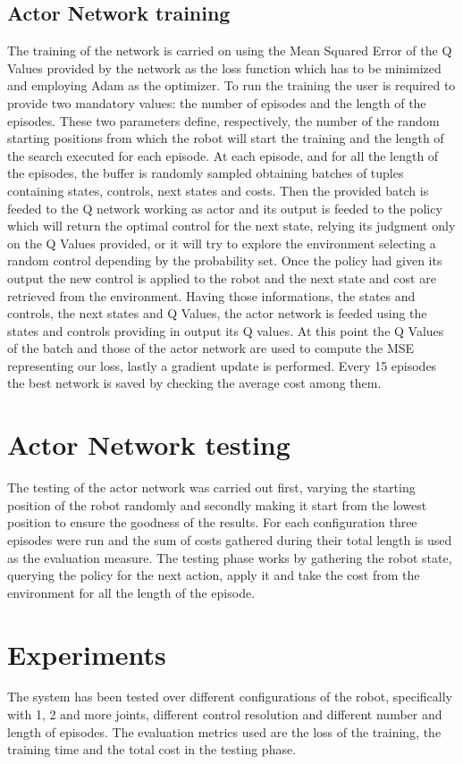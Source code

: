 \documentclass[twocolumn, a4paper]{article}
\begin{document}
\subsection{Actor Network training}
The training of the network is carried on using the Mean Squared Error of the
Q Values provided by the network as the loss function which has to be
minimized and employing Adam as the optimizer.
To run the training the user is required to provide two mandatory values: the
number of episodes and the length of the episodes. These two parameters define,
respectively, the number of the random starting positions from which the 
robot will start the training and the length of the search executed for each
episode.
At each episode, and for all the length of the episodes, the buffer is randomly
sampled obtaining batches of tuples containing states, controls, next states
and costs. Then the provided batch is feeded to the Q network working as actor
and its output is feeded to the policy which will return the optimal control
for the next state, relying its judgment only on the Q Values provided, or it 
will try to explore the environment selecting a random control depending
by the probability set.
Once the policy had given its output the new control is applied to the robot
and the next state and cost are retrieved from the environment.
Having those informations, the states and controls, the next states and Q
Values, the actor network is feeded using the states and controls providing in
output its Q values. At this point the Q Values of the batch and those of the
actor network are used to compute the MSE representing our loss, lastly a
gradient update is performed.
Every 15 episodes the best network is saved by checking the average cost
among them.

\section{Actor Network testing}
The testing of the actor network was carried out first, varying the starting
position of the robot randomly and secondly making it start from the lowest
position to ensure the goodness of the results.
For each configuration three episodes were run and the sum of costs gathered
during their total length is used as the evaluation measure.
The testing phase works by gathering the robot state, querying the policy
for the next action, apply it and take the cost from the environment for all
the length of the episode.

\section{Experiments}
The system has been tested over different configurations of the robot,
specifically with 1, 2 and more joints, different control resolution and
different number and length of episodes.
The evaluation metrics used are the loss of the training, the training time
and the total cost in the testing phase.
\end{document}
